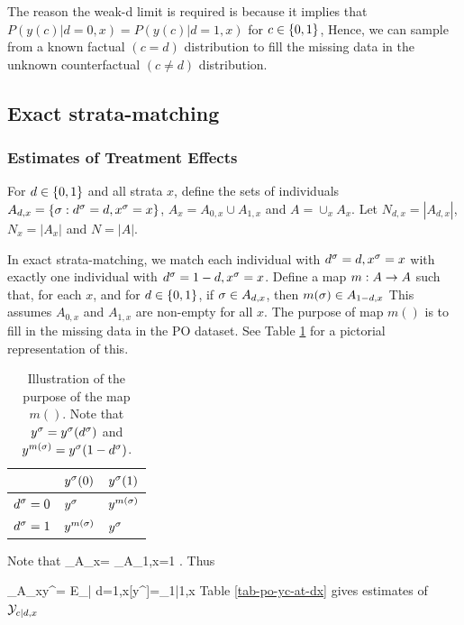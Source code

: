 The reason the weak-d limit
is required is because
it implies that $P(y(c)|d=0,x)=
P(y(c)|d=1,x)$ for $c\in \{0,1\}$,
Hence, we can sample from a
known factual $(c=d)$
distribution to
fill  the missing data
in the unknown counterfactual $(c\neq d)$
distribution.





\subsection{Exact   strata-matching}

\subsubsection{Estimates of Treatment Effects}
\label{sec-estimates}
For $ d\in \{0,1\}$ and all strata $x$,
define the sets of individuals
$A_{ d,x}=\{\sigma:  d^\sigma= d, x^\sigma=x\}$,
$A_x=A_{0,x}\cup A_{1,x}$ and $A=\cup_x A_x$.
Let $N_{ d,x}=|A_{ d,x}|$,
$N_x= |A_x|$ and $N=|A|$.

In exact   strata-matching,
we match each individual with
$ d^\sigma=d, x^\sigma=x$
with
exactly
one individual
with $ d^\sigma=1-d, x^\sigma=x$.
Define a map $m:A\rightarrow A$
such that,
for each $x$, and
for $d\in \{0,1\}$,
if $\sigma\in A_{d,x}$, then
$m(\sigma)\in A_{1-d,x}$
This assumes $A_{0,x}$ and $A_{1,x}$
are non-empty for all $x$.
The purpose of map $m()$
is
to fill in the missing data in the
PO dataset. See Table \ref{tab-po-s-map}
for a pictorial representation of
this.

\begin{table}[h!]
\centering
\begin{tabular}{|l|l|l|}
\hline
 & \cellcolor[HTML]{ECF4FF}$y^\sigma(0)$ & \cellcolor[HTML]{ECF4FF}$y^\sigma(1)$ \\ \hline
\cellcolor[HTML]{ECF4FF}$ d^\sigma=0$ & $y^\sigma$ & $y^{m(\sigma)}$ \\ \hline
\cellcolor[HTML]{ECF4FF}$ d^\sigma=1$ & $y^{m(\sigma)}$ & $y^\sigma$ \\ \hline
\end{tabular}
\caption{Illustration of the
purpose of the map $m()$.
Note that $y^\sigma=y^\sigma( d^\sigma)$
 and $y^{m(\sigma)}=y^\sigma(1-d^\sigma)$.}
\label{tab-po-s-map}
\end{table}



Note that
\beq
\sum_{\s\in A_{x}}=
\sum_{\s\in A_{1,x}}=1
\;.
\eeq
Thus

\beq
\sum_{\s\in A_{x}}y^\s=
E_{\s| d=1,x}[y^\s]=\caly_{1|1,x}
\eeq
Table \ref{tab-po-yc-at-dx}
gives
estimates of
$ {\cal Y}_{c| d ,x}$

